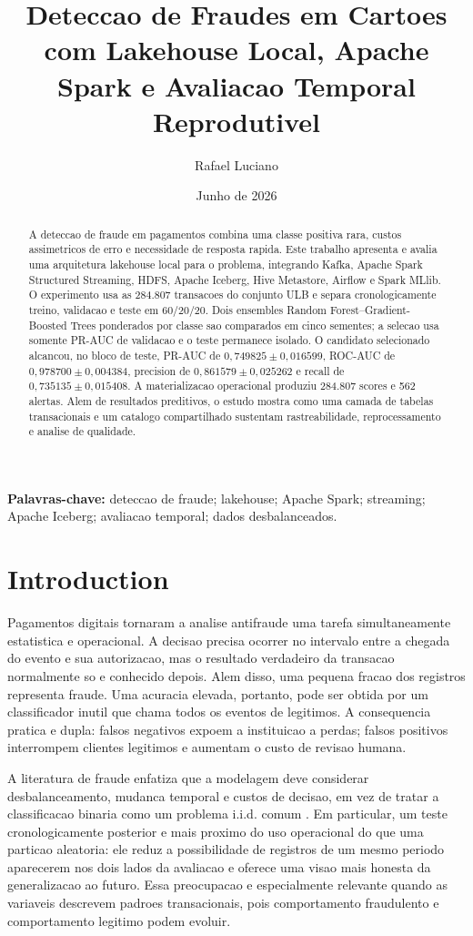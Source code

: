\documentclass[10pt,twocolumn]{article}
\title{Deteccao de Fraudes em Cartoes com Lakehouse Local, Apache Spark e Avaliacao Temporal Reprodutivel}
\author{Rafael Luciano}
\date{Junho de 2026}
\begin{document}
\maketitle

\begin{abstract}
A deteccao de fraude em pagamentos combina uma classe positiva rara, custos assimetricos de erro e necessidade de resposta rapida. Este trabalho apresenta e avalia uma arquitetura lakehouse local para o problema, integrando Kafka, Apache Spark Structured Streaming, HDFS, Apache Iceberg, Hive Metastore, Airflow e Spark MLlib. O experimento usa as 284.807 transacoes do conjunto ULB e separa cronologicamente treino, validacao e teste em 60/20/20. Dois ensembles Random Forest--Gradient-Boosted Trees ponderados por classe sao comparados em cinco sementes; a selecao usa somente PR-AUC de validacao e o teste permanece isolado. O candidato selecionado alcancou, no bloco de teste, PR-AUC de $0{,}749825 \pm 0{,}016599$, ROC-AUC de $0{,}978700 \pm 0{,}004384$, precision de $0{,}861579 \pm 0{,}025262$ e recall de $0{,}735135 \pm 0{,}015408$. A materializacao operacional produziu 284.807 scores e 562 alertas. Alem de resultados preditivos, o estudo mostra como uma camada de tabelas transacionais e um catalogo compartilhado sustentam rastreabilidade, reprocessamento e analise de qualidade.
\end{abstract}

\textbf{Palavras-chave:} deteccao de fraude; lakehouse; Apache Spark; streaming; Apache Iceberg; avaliacao temporal; dados desbalanceados.

\section{Introduction}

Pagamentos digitais tornaram a analise antifraude uma tarefa simultaneamente estatistica e operacional. A decisao precisa ocorrer no intervalo entre a chegada do evento e sua autorizacao, mas o resultado verdadeiro da transacao normalmente so e conhecido depois. Alem disso, uma pequena fracao dos registros representa fraude. Uma acuracia elevada, portanto, pode ser obtida por um classificador inutil que chama todos os eventos de legitimos. A consequencia pratica e dupla: falsos negativos expoem a instituicao a perdas; falsos positivos interrompem clientes legitimos e aumentam o custo de revisao humana.

A literatura de fraude enfatiza que a modelagem deve considerar desbalanceamento, mudanca temporal e custos de decisao, em vez de tratar a classificacao binaria como um problema i.i.d. comum \cite{ngai2011,dalpozzolo2015,dalpozzolo2018}. Em particular, um teste cronologicamente posterior e mais proximo do uso operacional do que uma particao aleatoria: ele reduz a possibilidade de registros de um mesmo periodo aparecerem nos dois lados da avaliacao e oferece uma visao mais honesta da generalizacao ao futuro. Essa preocupacao e especialmente relevante quando as variaveis descrevem padroes transacionais, pois comportamento fraudulento e comportamento legitimo podem evoluir.
\end{document}
